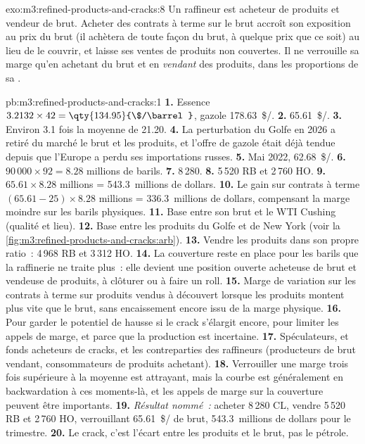 \begin{solution}{exo:m3:refined-products-and-cracks:8}
Un raffineur est acheteur de produits et vendeur de brut. Acheter des contrats à terme sur le brut accroît son exposition au
prix du brut (il achètera de toute façon du brut, à quelque prix que ce soit) au lieu de le couvrir, et laisse ses ventes de produits
non couvertes. Il ne verrouille sa marge qu'en achetant du brut et en
\emph{vendant} des produits, dans les proportions de sa .
\end{solution}

\begin{solution}{pb:m3:refined-products-and-cracks:1}
\textbf{1.} Essence $3.2132 \times 42 = \qty{134.95}{\$/\barrel}$, gazole
\qty{178.63}{\$/\barrel}. \textbf{2.} \qty{65.61}{\$/\barrel}. \textbf{3.} Environ 3.1 fois
la moyenne de \qty{21.20}{}. \textbf{4.} La perturbation du Golfe en 2026 a retiré du marché le brut et
les produits, et l'offre de gazole était déjà tendue depuis que l'Europe a perdu
ses importations russes. \textbf{5.} Mai 2022, \qty{62.68}{\$/\barrel}.
\textbf{6.} $90\,000 \times 92 = 8.28$ millions de barils. \textbf{7.} 8\,280. \textbf{8.}
5\,520 RB et 2\,760 HO. \textbf{9.} $65.61 \times 8.28$ millions = 543.3~millions de dollars.
\textbf{10.} Le gain sur contrats à terme $(65.61 - 25) \times 8.28$ millions = 336.3~millions de dollars,
compensant la marge moindre sur les barils physiques.
\textbf{11.} Base entre son brut et le WTI Cushing (qualité et lieu). \textbf{12.}
Base entre les produits du Golfe et de New York (voir la \cref{fig:m3:refined-products-and-cracks:arb}).
\textbf{13.} Vendre les produits dans son propre ratio~: 4\,968 RB et 3\,312 HO. \textbf{14.} La
couverture reste en place pour les barils que la raffinerie ne traite plus~: elle devient une position ouverte
acheteuse de brut et vendeuse de produits, à clôturer ou à faire un roll. \textbf{15.} Marge de variation sur
les contrats à terme sur produits vendus à découvert lorsque les produits montent plus vite que le brut, sans encaissement encore issu de
la marge physique. \textbf{16.} Pour garder le potentiel de hausse si le crack s'élargit encore, pour limiter
les appels de marge, et parce que la production est incertaine. \textbf{17.} Spéculateurs, 
et fonds acheteurs de cracks, et les contreparties des raffineurs (producteurs de brut vendant, consommateurs de produits
achetant). \textbf{18.} Verrouiller une marge trois fois supérieure à la moyenne est attrayant, mais
la courbe est généralement en backwardation à ces moments-là, et les appels de marge sur la couverture peuvent être
importants. \textbf{19.} \emph{Résultat nommé~:} acheter 8\,280 CL, vendre 5\,520 RB et 2\,760 HO,
verrouillant \qty{65.61}{\$/\barrel} de brut, 543.3~millions de dollars pour le trimestre. \textbf{20.}
Le crack, c'est l'écart entre les produits et le brut, pas le pétrole.
\end{solution}

